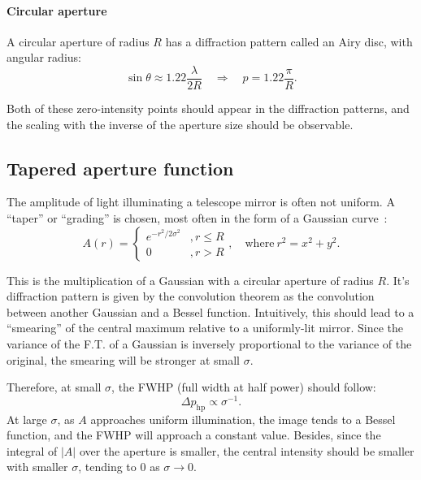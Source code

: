 \documentclass[11pt]{article}
\newcommand{\R}[1]{\mathrm{#1}}
\begin{document}
\paragraph{Circular aperture} A circular aperture of radius $R$ has a diffraction pattern called an Airy disc, with angular radius:
\begin{equation}\label{eqn:test_circ}
    \sin{\theta} \approx 1.22 \frac{\lambda}{2R} \quad \Rightarrow \quad p = 1.22 \frac{\pi}{R}.
\end{equation}

Both of these zero-intensity points should appear in the diffraction patterns, and the scaling with the inverse of the aperture size should be observable.

\subsection{Tapered aperture function}\label{sec:analysis:taper}
The amplitude of light illuminating a telescope mirror is often not uniform. A ``taper'' or ``grading'' is chosen, most often in the form of a Gaussian curve~\cite[Section~6.4]{RadioAstro}:
\begin{equation}
    A(r) = \begin{cases}
        e ^ {-r^2 / {2 \sigma^2}} &, r \leq R\\
        0 &, r > R
    \end{cases}, \quad \R{where}\ r^2 = x^2 + y^2.
\end{equation}

This is the multiplication of a Gaussian with a circular aperture of radius $R$. It's diffraction pattern is given by the convolution theorem as the convolution between another Gaussian and a Bessel function. Intuitively, this should lead to a ``smearing'' of the central maximum relative to a uniformly-lit mirror. Since the variance of the F.T. of a Gaussian is inversely proportional to the variance of the original, the smearing will be stronger at small $\sigma$.

Therefore, at small $\sigma$, the FWHP (full width at half power) should follow:
\begin{equation}
    \Delta p_{\R{hp}} \propto \sigma^{-1}.
\end{equation}
At large $\sigma$, as $A$ approaches uniform illumination, the image tends to a Bessel function, and the FWHP will approach a constant value. Besides, since the integral of $|A|$ over the aperture is smaller, the central intensity should be smaller with smaller $\sigma$, tending to 0 as $\sigma \rightarrow 0$.
\end{document}
